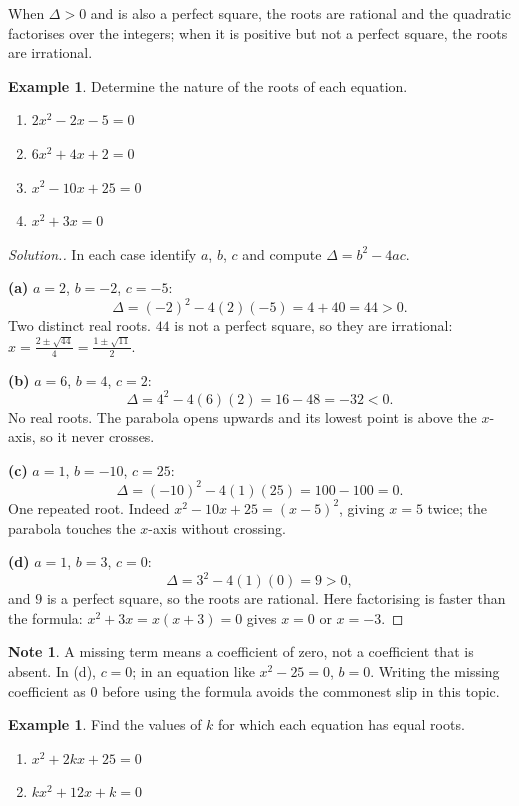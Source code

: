 \documentclass[11pt,a4paper]{article}
\theoremstyle{definition}
\newtheorem{example}[thm]{Example}
\newtheorem{note}[thm]{Note}
\newenvironment{solution}
  {\renewcommand{\qedsymbol}{}\begin{proof}[\textit{Solution}.]}
  {\end{proof}}
\begin{document}
When $\Delta>0$ and is also a perfect square, the roots are rational and the quadratic
factorises over the integers; when it is positive but not a perfect square, the roots
are irrational.

\begin{example}
Determine the nature of the roots of each equation.
\begin{enumerate}
\item[(a).] $2x^2-2x-5=0$
\item[(b).] $6x^2+4x+2=0$
\item[(c).] $x^2-10x+25=0$
\item[(d).] $x^2+3x=0$
\end{enumerate}
\end{example}

\begin{solution}
In each case identify $a$, $b$, $c$ and compute $\Delta=b^2-4ac$.

\textbf{(a)} $a=2$, $b=-2$, $c=-5$:
$$\Delta=(-2)^2-4(2)(-5)=4+40=44>0.$$
Two distinct real roots. $44$ is not a perfect square, so they are irrational:
$x=\frac{2\pm\sqrt{44}}{4}=\frac{1\pm\sqrt{11}}{2}$.

\textbf{(b)} $a=6$, $b=4$, $c=2$:
$$\Delta=4^2-4(6)(2)=16-48=-32<0.$$
No real roots. The parabola opens upwards and its lowest point is above the $x$-axis,
so it never crosses.

\textbf{(c)} $a=1$, $b=-10$, $c=25$:
$$\Delta=(-10)^2-4(1)(25)=100-100=0.$$
One repeated root. Indeed $x^2-10x+25=(x-5)^2$, giving $x=5$ twice; the parabola
touches the $x$-axis without crossing.

\textbf{(d)} $a=1$, $b=3$, $c=0$:
$$\Delta=3^2-4(1)(0)=9>0,$$
and $9$ is a perfect square, so the roots are rational. Here factorising is faster than
the formula: $x^2+3x=x(x+3)=0$ gives $x=0$ or $x=-3$.
\end{solution}

\begin{note}
A missing term means a coefficient of zero, not a coefficient that is absent. In (d),
$c=0$; in an equation like $x^2-25=0$, $b=0$. Writing the missing coefficient as $0$
before using the formula avoids the commonest slip in this topic.
\end{note}

\begin{example}
Find the values of $k$ for which each equation has equal roots.
\begin{enumerate}
\item[(a).] $x^2+2kx+25=0$
\item[(b).] $kx^2+12x+k=0$
\end{enumerate}
\end{example}
\end{document}
